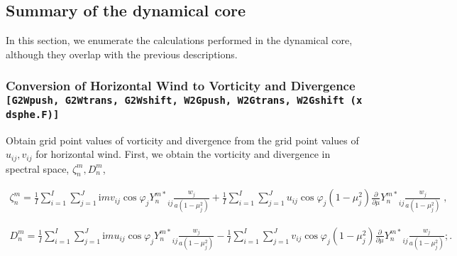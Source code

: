\hypertarget{summary-of-the-dynamical-core}{%
\subsection{Summary of the dynamical
core}\label{summary-of-the-dynamical-core}}

In this section, we enumerate the calculations performed in the
dynamical core, although they overlap with the previous descriptions.

\hypertarget{conversion-of-horizontal-wind-to-vorticity-and-divergence-g2wpush-g2wtrans-g2wshift-w2gpush-w2gtrans-w2gshift-xdsphe.f}{%
\subsubsection{\texorpdfstring{Conversion of Horizontal Wind to
Vorticity and Divergence
\texttt{{[}G2Wpush,\ G2Wtrans,\ G2Wshift,\ W2Gpush,\ W2Gtrans,\ W2Gshift\ (xdsphe.F){]}}}{Conversion of Horizontal Wind to Vorticity and Divergence {[}G2Wpush, G2Wtrans, G2Wshift, W2Gpush, W2Gtrans, W2Gshift (xdsphe.F){]}}}\label{conversion-of-horizontal-wind-to-vorticity-and-divergence-g2wpush-g2wtrans-g2wshift-w2gpush-w2gtrans-w2gshift-xdsphe.f}}

Obtain grid point values of vorticity and divergence from the grid point
values of \(u_{ij}, v_{ij}\) for horizontal wind. First, we obtain the
vorticity and divergence in spectral space, \(\zeta_n^m, D_n^m\),

\begin{eqnarray}
\zeta_n^m  =  \frac{1}{I} \sum_{i=1}^{I} \sum_{j=1}^{J}  
                  \mathrm{i}m v_{ij} \cos\varphi_j {Y_n^{m*}}_{ij}
                \frac{w_j}{a(1-\mu_j^{2})}
           +    \frac{1}{I} \sum_{i=1}^{I} \sum_{j=1}^{J}  
                     u_{ij} \cos\varphi_j (1-\mu_j^2)
                  \frac{\partial }{\partial \mu} {Y_n^{m*}}_{ij}
                 \frac{w_j}{a(1-\mu_j^{2})} \; ,
\end{eqnarray}

\begin{eqnarray}
    D_n^m  =  \frac{1}{I} \sum_{i=1}^{I} \sum_{j=1}^{J}  
                  \mathrm{i}m u_{ij} \cos\varphi_j {Y_n^{m*}}_{ij}
                \frac{w_j}{a(1-\mu_j^{2})}
           -    \frac{1}{I} \sum_{i=1}^{I} \sum_{j=1}^{J}  
                  v_{ij} \cos\varphi_j  (1-\mu_j^2)
                  \frac{\partial }{\partial \mu} {Y_n^{m*}}_{ij}
                 \frac{w_j}{a(1-\mu_j^{2})} ; .
\end{eqnarray}

